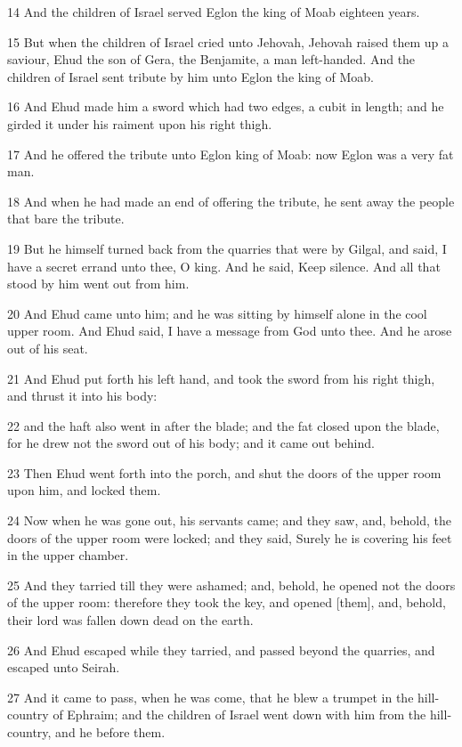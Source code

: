 \par 14 And the children of Israel served Eglon the king of Moab eighteen years.
\par 15 But when the children of Israel cried unto Jehovah, Jehovah raised them up a saviour, Ehud the son of Gera, the Benjamite, a man left-handed. And the children of Israel sent tribute by him unto Eglon the king of Moab.
\par 16 And Ehud made him a sword which had two edges, a cubit in length; and he girded it under his raiment upon his right thigh.
\par 17 And he offered the tribute unto Eglon king of Moab: now Eglon was a very fat man.
\par 18 And when he had made an end of offering the tribute, he sent away the people that bare the tribute.
\par 19 But he himself turned back from the quarries that were by Gilgal, and said, I have a secret errand unto thee, O king. And he said, Keep silence. And all that stood by him went out from him.
\par 20 And Ehud came unto him; and he was sitting by himself alone in the cool upper room. And Ehud said, I have a message from God unto thee. And he arose out of his seat.
\par 21 And Ehud put forth his left hand, and took the sword from his right thigh, and thrust it into his body:
\par 22 and the haft also went in after the blade; and the fat closed upon the blade, for he drew not the sword out of his body; and it came out behind.
\par 23 Then Ehud went forth into the porch, and shut the doors of the upper room upon him, and locked them.
\par 24 Now when he was gone out, his servants came; and they saw, and, behold, the doors of the upper room were locked; and they said, Surely he is covering his feet in the upper chamber.
\par 25 And they tarried till they were ashamed; and, behold, he opened not the doors of the upper room: therefore they took the key, and opened [them], and, behold, their lord was fallen down dead on the earth.
\par 26 And Ehud escaped while they tarried, and passed beyond the quarries, and escaped unto Seirah.
\par 27 And it came to pass, when he was come, that he blew a trumpet in the hill-country of Ephraim; and the children of Israel went down with him from the hill-country, and he before them.
